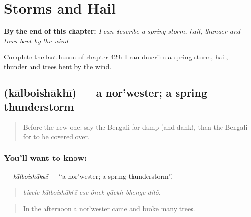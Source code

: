 
\chapter{Storms and Hail}
\label{ch:bn-storms-and-hail}

\begin{chapteropening}
\textbf{By the end of this chapter:} \emph{I can describe a spring storm, hail, thunder and trees bent by the wind.}

Complete the last lesson of chapter 429: I can describe a spring storm, hail, thunder and trees bent by the wind.
\end{chapteropening}

\section[\texorpdfstring{\bn{কালবৈশাখী} (kālboishākhī)}{কালবৈশাখী (kālboishākhī)}]{ (kālboishākhī) — a nor'wester; a spring thunderstorm}

\label{lesson:BN-C429-kalboishakhi}



\begin{quote}
Before the new one: say the Bengali for damp (and dank), then the Bengali for to be covered over.
\end{quote}

\subsection*{You'll want to know: }
\textbf{} — \emph{kālboishākhī} — \textquotedblleft{}a nor'wester; a spring thunderstorm\textquotedblright{}.

\begin{quote}
      
\end{quote}

\begin{quote}
\emph{bikele kālboishākhī ese ônek gāchh bhenge dilô.}
\end{quote}

\begin{quote}
In the afternoon a nor'wester came and broke many trees.
\end{quote}

